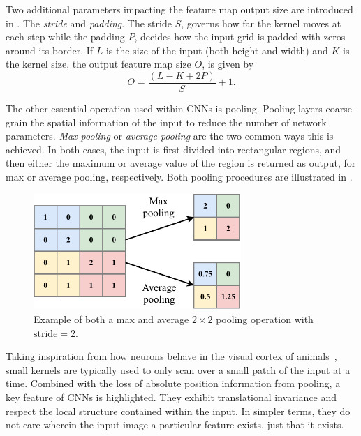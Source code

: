 Two additional parameters impacting the feature map output size are introduced in
. The \emph{stride} and \emph{padding}. The stride $S$, governs how
far the kernel moves at each step while the padding $P$, decides how the input grid is padded with
zeros around its border. If $L$ is the size of the input (both height and width) and $K$ is the
kernel size, the output feature map size $O$, is given by
\begin{equation}
    O=\frac{(L-K+2P)}{S}+1.
    \label{eq:conv_size}
\end{equation}

The other essential operation used within CNNs is pooling. Pooling layers coarse-grain the spatial
information of the input to reduce the number of network parameters. \emph{Max pooling} or
\emph{average pooling} are the two common ways this is achieved. In both cases, the input is first
divided into rectangular regions, and then either the maximum or average value of the region is
returned as output, for max or average pooling, respectively. Both pooling procedures are
illustrated in .

\begin{figure} %
    \includegraphics[width=0.7\textwidth]{diagrams/6-cnn/pooling.pdf}
    \caption[Example of pooling operation]
    {Example of both a max and average $2 \times 2$ pooling operation with $\text{stride}=2$.}
    \label{fig:pooling}
\end{figure}

Taking inspiration from how neurons behave in the visual cortex of animals~\cite{lecun2015}, small
kernels are typically used to only scan over a small patch of the input at a time. Combined with
the loss of absolute position information from pooling, a key feature of CNNs is highlighted. They
exhibit translational invariance and respect the local structure contained within the input. In
simpler terms, they do not care wherein the input image a particular feature exists, just that it
exists.

